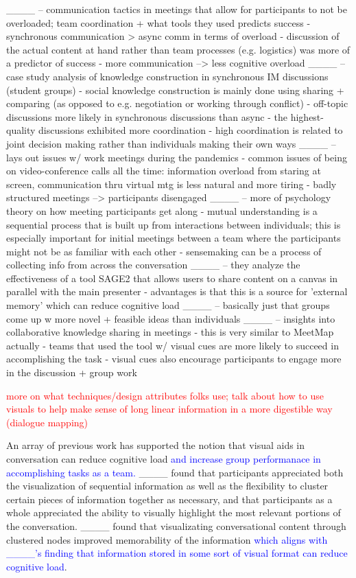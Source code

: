 ____ -- communication tactics in meetings that allow for participants to not be overloaded; team coordination + what tools they used predicts success
    - synchronous communication > async comm in terms of overload
    - discussion of the actual content at hand rather than team processes (e.g. logistics) was more of a predictor of success
    - more communication --> less cognitive overload 
____ -- case study analysis of knowledge construction in synchronous IM discussions (student groups)
    - social knowledge construction is mainly done using sharing + comparing (as opposed to e.g. negotiation or working through conflict)
    - off-topic discussions more likely in synchronous discussions than async
    - the highest-quality discussions exhibited more coordination
    - high coordination is related to joint decision making rather than individuals making their own ways
____ -- lays out issues w/ work meetings during the pandemics
    - common issues of being on video-conference calls all the time: information overload from staring at screen, communication thru virtual mtg is less natural and more tiring
    - badly structured meetings --> participants disengaged 
____ -- more of psychology theory on how meeting participants get along
    - mutual understanding is a sequential process that is built up from interactions between individuals; this is especially important for initial meetings between a team where the participants might not be as familiar with each other 
    - sensemaking can be a process of collecting info from across the conversation 
____ -- they analyze the effectiveness of a tool SAGE2 that allows users to share content on a canvas in parallel with the main presenter
    - advantages is that this is a source for 'external memory' which can reduce cognitive load
____ -- basically just that groups come up w more novel + feasible ideas than individuals
____ -- insights into collaborative knowledge sharing in meetings
    - this is very similar to MeetMap actually
    - teams that used the tool w/ visual cues are more likely to succeed in accomplishing the task
    - visual cues also encourage participants to engage more in the discussion + group work

\textcolor{red}{more on what techniques/design attributes folks use; talk about how to use visuals to help make sense of long linear information in a more digestible way (dialogue mapping)}

An array of previous work has supported the notion that visual aids in conversation can reduce cognitive load \textcolor{blue}{and increase group performanace in accomplishing tasks as a team.}
____ found that participants appreciated both the visualization of sequential information as well as the flexibility to cluster certain pieces of information together as necessary, and that participants as a whole appreciated the ability to visually highlight the most relevant portions of the conversation.
____ found that visualizating conversational content through clustered nodes improved memorability of the information \textcolor{blue}{which aligns with ____'s finding that information stored in some sort of visual format can reduce cognitive load}.

